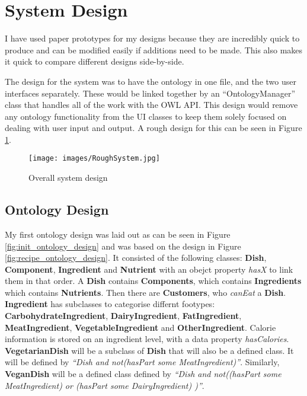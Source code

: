 \section{System Design}

I have used paper prototypes \cite{snyder2003paper} for my designs because they are incredibly quick to produce and can be modified easily if additions need to be made. This also makes it quick to compare different designs side-by-side.

The design for the system was to have the ontology in one file, and the two user interfaces separately. These would be linked together by an ``OntologyManager'' class that handles all of the work with the OWL API. This design would remove any ontology functionality from the UI classes to keep them solely focused on dealing with user input and output. A rough design for this can be seen in Figure \ref{fig:overall_system_design}.

\begin{figure}[h]
    \centering
    \captionsetup{justification=centering}
    \texttt{[image: images/RoughSystem.jpg]}
    \caption{Overall system design}
    \label{fig:overall_system_design}
\end{figure}

\subsection{Ontology Design}

My first ontology design was laid out as can be seen in Figure \ref{fig:init_ontology_design} and was based on the design in Figure \ref{fig:recipe_ontology_design}. It consisted of the following classes: \textbf{Dish}, \textbf{Component}, \textbf{Ingredient} and \textbf{Nutrient} with an obejct property \textit{hasX} to link them in that order. A \textbf{Dish} contains \textbf{Components}, which contains \textbf{Ingredients} which contains \textbf{Nutrients}. Then there are \textbf{Customers}, who \textit{canEat} a \textbf{Dish}. \textbf{Ingredient} has subclasses to categorise differnt footypes: \textbf{CarbohydrateIngredient}, \textbf{DairyIngredient}, \textbf{FatIngredient}, \textbf{MeatIngredient}, \textbf{VegetableIngredient} and \textbf{OtherIngredient}. Calorie information is stored on an ingredient level, with a data property \textit{hasCalories}. \textbf{VegetarianDish} will be a subclass of \textbf{Dish} that will also be a defined class. It will be defined by \textit{ ``Dish and not(hasPart some MeatIngredient)''}. Similarly, \textbf{VeganDish} will be a defined class defined by \textit{ ``Dish and not((hasPart some MeatIngredient) or (hasPart some DairyIngredient) )''}.

